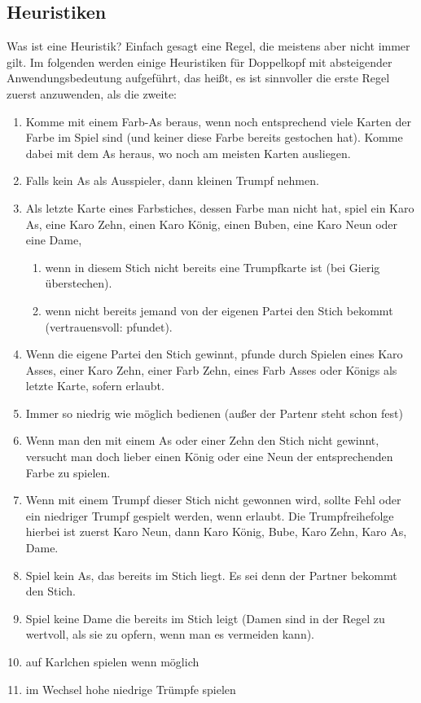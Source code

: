 \documentclass[12pt,a4paper]{article}
\begin{document}
\subsection{Heuristiken}
Was ist eine Heuristik? Einfach gesagt eine Regel, die meistens aber nicht immer gilt. Im folgenden
werden einige Heuristiken für Doppelkopf mit absteigender Anwendungsbedeutung aufgeführt, das heißt,
es ist sinnvoller die erste Regel zuerst anzuwenden, als die zweite:
\begin{enumerate}
\item Komme mit einem Farb-As beraus, wenn noch entsprechend viele Karten der Farbe im Spiel sind (und keiner
diese Farbe bereits gestochen hat). Komme dabei mit dem As heraus, wo noch am meisten Karten ausliegen.
\item Falls kein As als Ausspieler, dann kleinen Trumpf nehmen.
\item Als letzte Karte eines Farbstiches, dessen Farbe man nicht hat, spiel ein Karo As, eine Karo Zehn,
einen Karo König, einen Buben, eine Karo Neun oder eine Dame,
\begin{enumerate}
\item wenn in diesem Stich nicht bereits eine Trumpfkarte ist (bei Gierig überstechen).
\item wenn nicht bereits jemand von der eigenen Partei den Stich bekommt (vertrauensvoll: pfundet).
\end{enumerate}
\item Wenn die eigene Partei den Stich gewinnt, pfunde durch Spielen eines Karo Asses, einer Karo Zehn, einer Farb Zehn, eines Farb
Asses oder Königs als letzte Karte, sofern erlaubt.
\item Immer so niedrig wie möglich bedienen (außer der Partenr steht schon fest)
\item Wenn man den mit einem As oder einer Zehn den Stich nicht gewinnt, versucht man doch lieber einen König oder eine
Neun der entsprechenden Farbe zu spielen.
\item Wenn mit einem Trumpf dieser Stich nicht gewonnen wird, sollte Fehl oder ein niedriger Trumpf gespielt werden, wenn erlaubt. Die Trumpfreihefolge hierbei ist zuerst
Karo Neun, dann Karo König, Bube, Karo Zehn, Karo As, Dame.
\item Spiel kein As, das bereits im Stich liegt. Es sei denn der Partner bekommt den Stich.
\item Spiel keine Dame die bereits im Stich leigt (Damen sind in der Regel zu wertvoll, als sie zu opfern, wenn man es vermeiden kann).
\item auf Karlchen spielen wenn möglich
\item im Wechsel hohe niedrige Trümpfe spielen
\end{enumerate}
\end{document}
